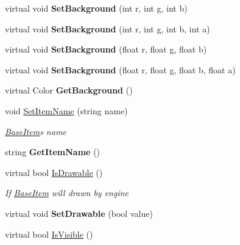 \begin{DoxyCompactItemize}
virtual void {\bfseries Set\+Background} (int r, int g, int b)
\item 
\mbox{\label{class_space_v_i_l_1_1_base_item_a9d750bcf2254f44623cf1697ebbd9ca8}} 
virtual void {\bfseries Set\+Background} (int r, int g, int b, int a)
\item 
\mbox{\label{class_space_v_i_l_1_1_base_item_a6134cdb21d533ac5186e4acd30fe465c}} 
virtual void {\bfseries Set\+Background} (float r, float g, float b)
\item 
\mbox{\label{class_space_v_i_l_1_1_base_item_a2b47d3fe8c356d1756bbff999d476e07}} 
virtual void {\bfseries Set\+Background} (float r, float g, float b, float a)
\item 
\mbox{\label{class_space_v_i_l_1_1_base_item_ab6a7649082ecc3da16b450dad6360c1d}} 
virtual Color {\bfseries Get\+Background} ()
\item 
void \mbox{\hyperlink{class_space_v_i_l_1_1_base_item_a10bc09b650b0e0ed08536b402beb6813}{Set\+Item\+Name}} (string name)
\begin{DoxyCompactList}\small\item\em \mbox{\hyperlink{class_space_v_i_l_1_1_base_item}{Base\+Item}}\textquotesingle{}s name \end{DoxyCompactList}\item 
\mbox{\label{class_space_v_i_l_1_1_base_item_a70fc344d02591cf519cd36e278e6f95f}} 
string {\bfseries Get\+Item\+Name} ()
\item 
virtual bool \mbox{\hyperlink{class_space_v_i_l_1_1_base_item_a002a247f3745be1e1e57c504589d7036}{Is\+Drawable}} ()
\begin{DoxyCompactList}\small\item\em If \mbox{\hyperlink{class_space_v_i_l_1_1_base_item}{Base\+Item}} will drawn by engine \end{DoxyCompactList}\item 
\mbox{\label{class_space_v_i_l_1_1_base_item_a7dfcfb7cb25bf50d10941e59e919d3f8}} 
virtual void {\bfseries Set\+Drawable} (bool value)
\item 
virtual bool \mbox{\hyperlink{class_space_v_i_l_1_1_base_item_a29b915d6e655b48a8b7505118441e961}{Is\+Visible}} ()

\end{DoxyCompactItemize}
